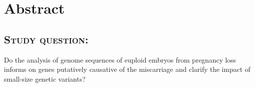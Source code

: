 \section*{Abstract}





\subsection*{\textsc{Study question:}} 


Do the analysis of genome sequences of euploid embryos from pregnancy loss informs on genes putatively causative of the miscarriage and clarify the impact of small-size genetic variants? %


